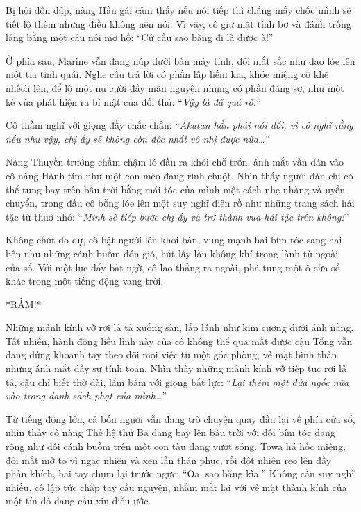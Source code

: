 \documentclass[../main.tex]{subfiles}
\begin{document}
Bị hỏi dồn dập, nàng Hầu gái cảm thấy nếu nói tiếp thì chẳng mấy chốc mình sẽ tiết lộ thêm những điều không nên nói. Vì vậy, cô giữ mặt tỉnh bơ và đánh trống lảng bằng một câu nói mơ hồ: ``Cứ cầu sao băng đi là được à!''

Ở phía sau, Marine vẫn đang núp dưới bàn máy tính, đôi mắt sắc như dao lóe lên một tia tinh quái. Nghe câu trả lời có phần lấp liếm kia, khóe miệng cô khẽ nhếch lên, để lộ một nụ cười đầy mãn nguyện nhưng có phần đáng sợ, như một kẻ vừa phát hiện ra bí mật của đối thủ: ``\textit{Vậy là đã quá rõ.}''


Cô thầm nghĩ với giọng đầy chắc chắn: ``\textit{Akutan hẳn phải nói dối, vì cô nghĩ rằng nếu như vậy, chị ấy sẽ không còn độc nhất vô nhị được nữa\dots}''

Nàng Thuyền trưởng chầm chậm ló đầu ra khỏi chỗ trốn, ánh mắt vẫn dán vào cô nàng Hành tím như một con mèo đang rình chuột. Nhìn thấy người đàn chị có thể tung bay trên bầu trời bằng mái tóc của mình một cách nhẹ nhàng và uyển chuyển, trong đầu cô bỗng lóe lên một suy nghĩ điên rồ như những trang sách hải tặc từ thuở nhỏ: ``\textit{Mình sẽ tiếp bước chị ấy và trở thành vua hải tặc trên không!}''

Không chút do dự, cô bật người lên khỏi bàn, vung mạnh hai bím tóc sang hai bên như những cánh buồm đón gió, hút lấy làn không khí trong lành từ ngoài cửa sổ. Với một lực đẩy bất ngờ, cô lao thẳng ra ngoài, phá tung một ô cửa sổ khác trong một tiếng động vang trời.

*RẦM!*

Những mảnh kính vỡ rơi lả tả xuống sàn, lấp lánh như kim cương dưới ánh nắng. Tất nhiên, hành động liều lĩnh này của cô không thể qua mắt được cậu Tổng vẫn đang đứng khoanh tay theo dõi mọi việc từ một góc phòng, vẻ mặt bình thản nhưng ánh mắt đầy sự tính toán. Nhìn thấy những mảnh kính vỡ tiếp tục rơi lả tả, cậu chỉ biết thở dài, lẩm bẩm với giọng bất lực: ``\textit{Lại thêm một đứa ngốc nữa vào trong danh sách phạt của mình\dots}''

Từ tiếng động lớn, cả bốn người vẫn đang trò chuyện quay đầu lại về phía cửa sổ, nhìn thấy cô nàng Thế hệ thứ Ba đang bay lên bầu trời với đôi bím tóc dang rộng như đôi cánh buồm trên một con tàu đang vượt sóng. Towa há hốc miệng, đôi mắt mở to vì ngạc nhiên và xen lẫn thán phục, rồi đột nhiên reo lên đầy phấn khích, hai tay chụm lại trước ngực: ``Oa, sao băng kìa!'' Không cần suy nghĩ nhiều, cô lập tức chắp tay cầu nguyện, nhắm mắt lại với vẻ mặt thành kính của một tín đồ đang cầu xin điều ước.
\end{document}
